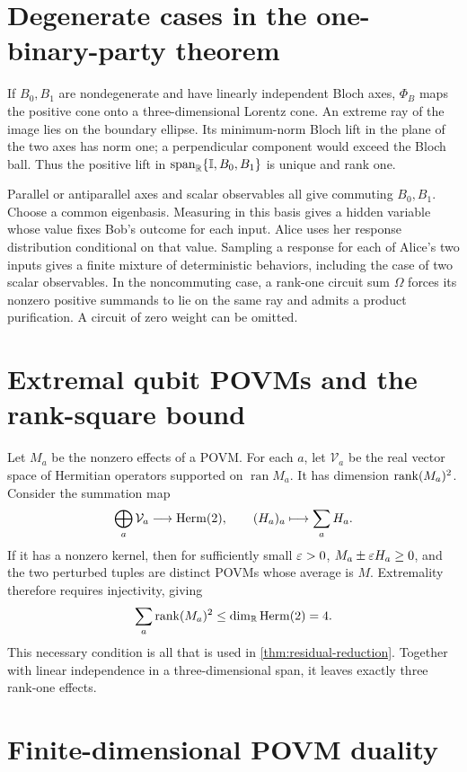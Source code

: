\section{Degenerate cases in the one-binary-party theorem}
\label{app:binary-degeneracies}

If \(B_0,B_1\) are nondegenerate and have linearly independent Bloch axes,
\(\Phi_B\) maps the positive cone onto a three-dimensional Lorentz cone.
An extreme ray of the image lies on the boundary ellipse. Its minimum-norm
Bloch lift in the plane of the two axes has norm one; a perpendicular
component would exceed the Bloch ball. Thus the positive lift in
\(\operatorname{span}_{\mathbb R}\{\mathbb I,B_0,B_1\}\) is unique and rank one.

Parallel or antiparallel axes and scalar observables all give commuting
\(B_0,B_1\). Choose a common eigenbasis. Measuring in this basis gives
a hidden variable whose value fixes Bob's outcome for each input. Alice
uses her response distribution conditional on that value. Sampling a
response for each of Alice's two inputs gives a finite mixture of
deterministic behaviors, including the case of two scalar observables.
In the noncommuting case, a rank-one circuit sum \(\Omega\) forces its
nonzero positive summands to lie on the same ray and admits a product
purification. A circuit of zero weight can be omitted.

\section{Extremal qubit POVMs and the rank-square bound}
\label{app:extremal-povm}

Let \(M_a\) be the nonzero effects of a POVM. For each \(a\), let
\(\mathcal V_a\) be the real vector space of Hermitian operators supported on
\(\operatorname{ran}M_a\). It has dimension \(\operatorname{rank}(M_a)^2\).
Consider the summation map
\[
\bigoplus_a\mathcal V_a\longrightarrow\operatorname{Herm}(2),\qquad
(H_a)_a\longmapsto\sum_aH_a.
\]
If it has a nonzero kernel, then for sufficiently small \(\varepsilon>0\),
\(M_a\pm\varepsilon H_a\ge0\), and the two perturbed tuples are distinct POVMs whose
average is \(M\). Extremality therefore requires injectivity, giving
\[
\sum_a\operatorname{rank}(M_a)^2\le\dim_{\mathbb R}\operatorname{Herm}(2)=4.
\]
This necessary condition is all that is used in
\cref{thm:residual-reduction}. Together with linear independence in a
three-dimensional span, it leaves exactly three rank-one effects.

\section{Finite-dimensional POVM duality}
\label{app:duality}

